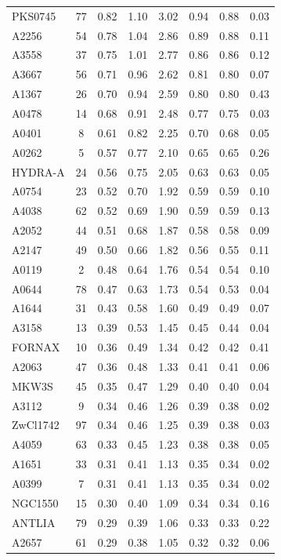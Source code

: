 \documentclass[10pt,aps,pra,reprint,amsmath,amsfonts,amssymb,showpacs,nofootinbib,floatfix]{revtex4-1}
\begin{document}
\begin{table}
\begin{minipage}{2.0\columnwidth}
\begin{tabular}{l c c c c c c c}
PKS0745 & 77 & 0.82 & 1.10 & 3.02 & 0.94 & 0.88 & 0.03 \\
A2256 & 54 & 0.78 & 1.04 & 2.86 & 0.89 & 0.88 & 0.11 \\
A3558 & 37 & 0.75 & 1.01 & 2.77 & 0.86 & 0.86 & 0.12 \\
A3667 & 56 & 0.71 & 0.96 & 2.62 & 0.81 & 0.80 & 0.07 \\
A1367 & 26 & 0.70 & 0.94 & 2.59 & 0.80 & 0.80 & 0.43 \\
A0478 & 14 & 0.68 & 0.91 & 2.48 & 0.77 & 0.75 & 0.03 \\
A0401 & 8 & 0.61 & 0.82 & 2.25 & 0.70 & 0.68 & 0.05 \\
A0262 & 5 & 0.57 & 0.77 & 2.10 & 0.65 & 0.65 & 0.26 \\
HYDRA-A & 24 & 0.56 & 0.75 & 2.05 & 0.63 & 0.63 & 0.05 \\
A0754 & 23 & 0.52 & 0.70 & 1.92 & 0.59 & 0.59 & 0.10 \\
A4038 & 62 & 0.52 & 0.69 & 1.90 & 0.59 & 0.59 & 0.13 \\
A2052 & 44 & 0.51 & 0.68 & 1.87 & 0.58 & 0.58 & 0.09 \\
A2147 & 49 & 0.50 & 0.66 & 1.82 & 0.56 & 0.55 & 0.11 \\
A0119 & 2 & 0.48 & 0.64 & 1.76 & 0.54 & 0.54 & 0.10 \\
A0644 & 78 & 0.47 & 0.63 & 1.73 & 0.54 & 0.53 & 0.04 \\
A1644 & 31 & 0.43 & 0.58 & 1.60 & 0.49 & 0.49 & 0.07 \\
A3158 & 13 & 0.39 & 0.53 & 1.45 & 0.45 & 0.44 & 0.04 \\
FORNAX & 10 & 0.36 & 0.49 & 1.34 & 0.42 & 0.42 & 0.41 \\
A2063 & 47 & 0.36 & 0.48 & 1.33 & 0.41 & 0.41 & 0.06 \\
MKW3S & 45 & 0.35 & 0.47 & 1.29 & 0.40 & 0.40 & 0.04 \\
A3112 & 9 & 0.34 & 0.46 & 1.26 & 0.39 & 0.38 & 0.02 \\
ZwCl1742 & 97 & 0.34 & 0.46 & 1.25 & 0.39 & 0.38 & 0.03 \\
A4059 & 63 & 0.33 & 0.45 & 1.23 & 0.38 & 0.38 & 0.05 \\
A1651 & 33 & 0.31 & 0.41 & 1.13 & 0.35 & 0.34 & 0.02 \\
A0399 & 7 & 0.31 & 0.41 & 1.13 & 0.35 & 0.34 & 0.02 \\
NGC1550 & 15 & 0.30 & 0.40 & 1.09 & 0.34 & 0.34 & 0.16 \\
ANTLIA & 79 & 0.29 & 0.39 & 1.06 & 0.33 & 0.33 & 0.22 \\
A2657 & 61 & 0.29 & 0.38 & 1.05 & 0.32 & 0.32 & 0.06 \\

\end{tabular}
\end{minipage}
\end{table}
\end{document}
